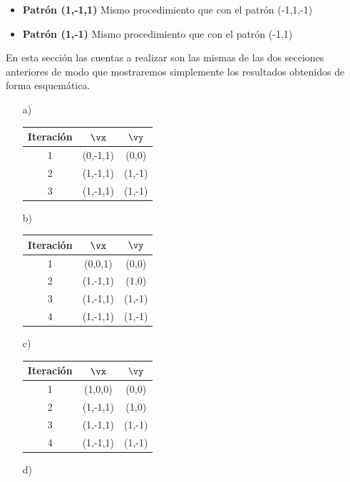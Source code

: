 \begin{problem}[10]
\begin{itemize}
\item \textbf{Patrón (1,-1,1)}
Mismo procedimiento que con el patrón (-1,1,-1)

\item \textbf{Patrón (1,-1)}
Mismo procedimiento que con el patrón (-1,1)
\end{itemize}

\spart

En esta sección las cuentas a realizar son las mismas de las dos secciones anteriores de modo que mostraremos simplemente los resultados obtenidos de forma esquemática.

\begin{multicols}{2}
\begin{enumerate}

\item[a)]

\begin{tabular}{|ccc|}
\hline
\textbf{Iteración} & $\vx$ & $\vy$ \\
\hline
1 & (0,-1,1) & (0,0) \\
\hline
2 & (1,-1,1) & (1,-1) \\
\hline
3 & (1,-1,1) & (1,-1) \\
\hline
\end{tabular}

\item[b)]

\begin{tabular}{|ccc|}
\hline
\textbf{Iteración} & $\vx$ & $\vy$ \\
\hline
1 & (0,0,1) & (0,0) \\
\hline
2 & (1,-1,1) & (1,0) \\
\hline
3 & (1,-1,1) & (1,-1) \\
\hline
4 & (1,-1,1) & (1,-1) \\
\hline
\end{tabular}

\item[c)]

\begin{tabular}{|ccc|}
\hline
\textbf{Iteración} & $\vx$ & $\vy$ \\
\hline
1 & (1,0,0) & (0,0) \\
\hline
2 & (1,-1,1) & (1,0) \\
\hline
3 & (1,-1,1) & (1,-1) \\
\hline
4 & (1,-1,1) & (1,-1) \\
\hline
\end{tabular}

\item[d)]


\end{enumerate}
\end{multicols}
\end{problem}

